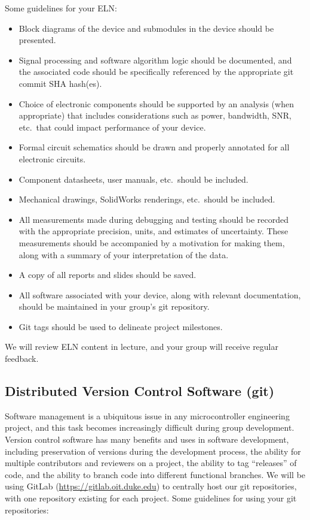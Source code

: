 Some guidelines for your ELN:

\begin{itemize}
    \item Block diagrams of the device and submodules in the device should be
        presented.
    \item Signal processing and software algorithm logic should be documented,
        and the associated code should be specifically referenced by the
        appropriate git commit SHA hash(es).
    \item Choice of electronic components should be supported by an analysis
        (when appropriate) that includes considerations such as power,
        bandwidth, SNR, etc.\ that could impact performance of your device.
    \item Formal circuit schematics should be drawn and properly annotated for
        all electronic circuits.
    \item Component datasheets, user manuals, etc.\ should be included.
    \item Mechanical drawings, SolidWorks renderings, etc.\ should be included.
    \item All measurements made during debugging and testing should be recorded
        with the appropriate precision, units, and estimates of uncertainty.
        These measurements should be accompanied by a motivation for making
        them, along with a summary of your interpretation of the data.
    \item A copy of all reports and slides should be saved.
    \item All software associated with your device, along with relevant
        documentation, should be maintained in your group's git repository.  
    \item Git tags should be used to delineate project milestones.
\end{itemize}

We will review ELN content in lecture, and your group will receive regular
feedback.

\subsection*{Distributed Version Control Software (git)} 
Software management is a ubiquitous issue in any microcontroller engineering
project, and this task becomes increasingly difficult during group development.
Version control software has many benefits and uses in software development,
including preservation of versions during the development process, the ability
for multiple contributors and reviewers on a project, the ability to tag
``releases'' of code, and the ability to branch code into different functional
branches.  We will be using GitLab (\url{https://gitlab.oit.duke.edu}) to
centrally host our git repositories, with one repository existing for each
project.  Some guidelines for using your git repositories:


